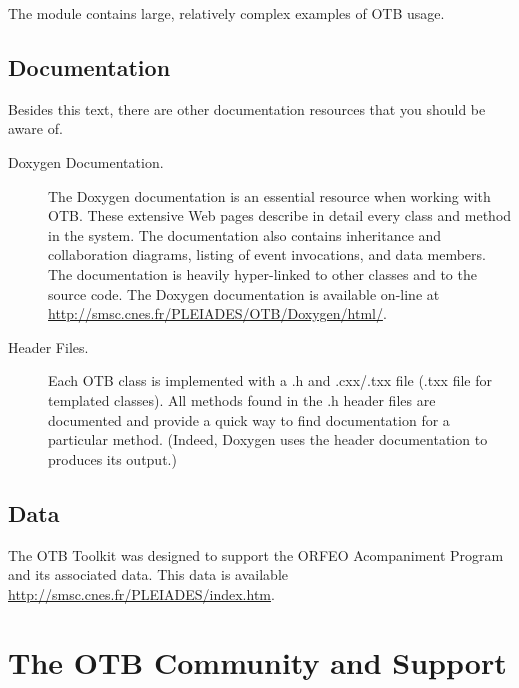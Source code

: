 The  module contains large, relatively complex
examples of OTB usage.%


\subsection{Documentation}
\label{sec:Documentation}

Besides this text, there are other documentation resources that you should be
aware of.
\begin{description}
        \item[Doxygen Documentation.] The Doxygen documentation is an
        essential resource when working with OTB. These extensive Web
        pages describe in detail every class and method in the
        system. The documentation also contains inheritance and
        collaboration diagrams, listing of event invocations, and data
        members. The documentation is heavily hyper-linked to other
        classes and to the source code. The Doxygen documentation is
        available on-line at
        \url{http://smsc.cnes.fr/PLEIADES/OTB/Doxygen/html/}.

	\item[Header Files.] Each OTB class is implemented with a .h and
        .cxx/.txx file (.txx file for templated classes). All methods
        found in the .h header files are documented and provide a quick way
        to find documentation for a particular method. (Indeed, Doxygen uses
        the header documentation to produces its output.)
\end{description}

\subsection{Data}
\label{sec:Data}

The OTB Toolkit was designed to support the ORFEO Acompaniment Program 
and its associated data. This data is available \url{http://smsc.cnes.fr/PLEIADES/index.htm}.


\section{The OTB Community and Support}
\label{sec:AdditionalResources}

